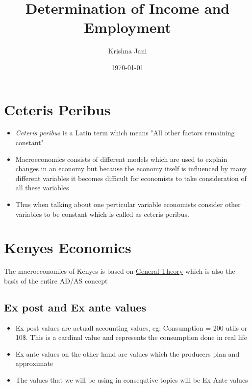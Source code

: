 \documentclass[11pt]{article}
\author{Krishna Jani}
\date{\today}
\title{Determination of Income and Employment}
\begin{document}
\maketitle
\tableofcontents


\section{Ceteris Peribus}
\label{sec:orgbe1c1d1}
\begin{itemize}
\item \emph{Ceteris peribus} is a Latin term which means "All other factors remaining constant"
\item Macroeconomics consists of different models which are used to explain changes in an economy but because the economy itself is influenced by many different variables it becomes difficult for economists to take consideration of all these variables
\item Thus when talking about one perticular variable economists consider other variables to be constant which is called as ceteris peribus.
\end{itemize}

\section{Kenyes Economics}
\label{sec:orgd2c72ac}
The macroeconomics of Kenyes is based on  \href{General Theory Kenyes.org}{General Theory} which is also the basis of the entire AD/AS concept

\subsection{Ex post and Ex ante values}
\label{sec:orgd152e32}
\begin{itemize}
\item Ex post values are actuall accounting values, eg: Consumption = 200 utils or 10\$. This is a cardinal value and represents the consumption done in real life
\item Ex ante values on the other hand are values which the producers plan and  approximate
\item The values that we will be using in consequtive topics will be Ex Ante values
\end{itemize}
\end{document}
